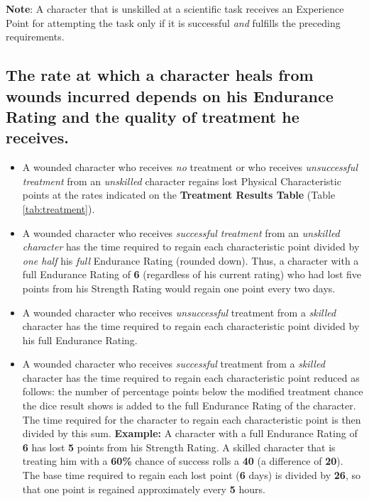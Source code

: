 \textbf{Note}: A character that is unskilled at a scientific task
receives an Experience Point for attempting the task only if it is
successful \emph{and} fulfills the preceding requirements.

\subsection[Rate Of Healing]{The rate at which a character heals
  from wounds incurred depends on his Endurance Rating and the quality
  of treatment he receives.}
\label{sec:rate-of-healing}

\begin{itemize}
\item A wounded character who receives \emph{no} treatment or who
  receives \emph{unsuccessful treatment} from an \emph{unskilled}
  character regains lost Physical Characteristic points at the rates
  indicated on the \textbf{Treatment Results Table} (Table
  \vref{tab:treatment}).
\item A wounded character who receives \emph{successful treatment}
  from an \emph{unskilled character} has the time required to regain
  each characteristic point divided by \emph{one half} his \emph{full}
  Endurance Rating (rounded down).  Thus, a character with a full
  Endurance Rating of \textbf{6} (regardless of his current rating)
  who had lost five points from his Strength Rating would regain one
  point every two days.
\item A wounded character who receives \emph{unsuccessful} treatment
  from a \emph{skilled} character has the time required to regain each
  characteristic point divided by his full Endurance Rating.
\item A wounded character who receives \emph{successful} treatment
  from a \emph{skilled} character has the time required to regain each
  characteristic point reduced as follows: the number of percentage
  points below the modified treatment chance the dice result shows is
  added to the full Endurance Rating of the character.  The time
  required for the character to regain each characteristic point is
  then divided by this sum.  \textbf{Example:} A character with a full
  Endurance Rating of \textbf{6} has lost \textbf{5} points from his
  Strength Rating.  A skilled character that is treating him with a
  \textbf{60\%} chance of success rolls a \textbf{40} (a difference of
  \textbf{20}).  The base time required to regain each lost point
  (\textbf{6} days) is divided by \textbf{26}, so that one point is
  regained approximately every \textbf{5} hours.
\end{itemize}


